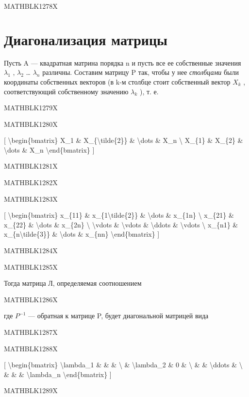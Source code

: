 \documentclass[
]{article}
\begin{document}
MATHBLK1278X

\section{Диагонализация
матрицы}\label{ux434ux438ux430ux433ux43eux43dux430ux43bux438ux437ux430ux446ux438ux44f-ux43cux430ux442ux440ux438ux446ux44b}

Пусть A --- квадратная матрина порядка n и пусть все ее собственные
значения \(\lambda_1\) , \(\lambda_2\) \ldots{} \(\lambda_n\) различны.
Составим матрицу P так, чтобы у нее \emph{столбцами} были координаты
собственных векторов (в k-м столбце стоит собственный вектор \(X_k\) ,
соответствующий собственному значению \(\lambda_k\) ), т. е.

MATHBLK1279X

MATHBLK1280X

{[} \textbackslash begin\{bmatrix\} X\_1 \&
X\_\{\textbackslash tilde\{2\}\} \& \textbackslash dots \& X\_n
\textbackslash{} X\_\{1\} \& X\_\{2\} \& \textbackslash dots \& X\_n
\textbackslash end\{bmatrix\} {]}

MATHBLK1281X

MATHBLK1282X

MATHBLK1283X

{[} \textbackslash begin\{bmatrix\} x\_\{11\} \&
x\_\{1\textbackslash tilde\{2\}\} \& \textbackslash dots \& x\_\{1n\}
\textbackslash{} x\_\{21\} \& x\_\{22\} \& \textbackslash dots \&
x\_\{2n\} \textbackslash{} \textbackslash vdots \& \textbackslash vdots
\& \textbackslash ddots \& \textbackslash vdots \textbackslash{}
x\_\{n1\} \& x\_\{n\textbackslash tilde\{3\}\} \& \textbackslash dots \&
x\_\{nn\} \textbackslash end\{bmatrix\} {]}

MATHBLK1284X

MATHBLK1285X

Тогда матрица Л, определяемая соотношением

MATHBLK1286X

где \(P^{-1}\) --- обратная к матрице P, будет диагональной матрицей
вида

MATHBLK1287X

MATHBLK1288X

{[} \textbackslash begin\{bmatrix\} \textbackslash lambda\_1 \& \& \&
\textbackslash{} \& \textbackslash lambda\_2 \& 0 \& \textbackslash{} \&
\& \textbackslash ddots \& \textbackslash{} \& \& \&
\textbackslash lambda\_n \textbackslash end\{bmatrix\} {]}

MATHBLK1289X
\end{document}
